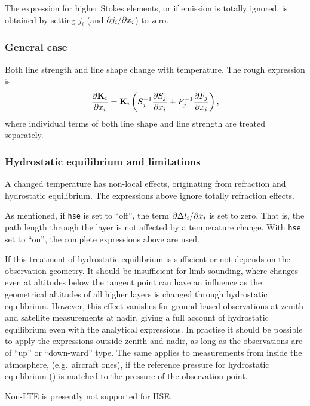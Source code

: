 The expression for higher Stokes elements, or if emission is totally ignored,
is obtained by setting $j_i$ (and $\partial j_i/\partial x_{i}$) to zero.


\subsubsection{General case}
%
Both line strength and line shape change with temperature.
The rough expression is
\begin{equation}
  \frac{\partial \mathbf{K}_i}{\partial x_i} = \mathbf{K}_i
  \left(
  S_j^{-1}\frac{\partial S_j}{\partial x_i}+
  F_j^{-1}\frac{\partial F_j}{\partial x_i}
  \right),
\end{equation}
where individual terms of both line shape and line strength are
treated separately.

\subsubsection{Hydrostatic equilibrium and limitations}
%
A changed temperature has non-local effects, originating from refraction and
hydrostatic equilibrium. The expressions above ignore totally refraction
effects. 

As  mentioned,  if \verb|hse|  is  set  to  ``off'',  the term  $\partial  \Delta
l_{i}/\partial x_{i}$  is set  to  zero. That  is,  the path  length
through the layer is not affected  by a temperature change. With \verb|hse| set
to ``on'', the complete expressions above are used.

If this treatment of hydrostatic equilibrium is sufficient or not depends on
the observation geometry. It should be insufficient for limb sounding,
where changes even at altitudes below the tangent point can have an influence
as the geometrical altitudes of all higher layers is changed through
hydrostatic equilibrium.  However, this effect vanishes for
ground-based observations at zenith and satellite measurements at nadir, giving
a full account of hydrostatic equilibrium even with the analytical expressions.
In practise it should be possible to apply the expressions outside zenith and
nadir, as long as the observations are of ``up'' or ``down-ward'' type. The
same applies to measurements from inside the atmosphere, (e.g.\ aircraft ones),
if the reference pressure for hydrostatic equilibrium () is
matched to the pressure of the observation point.

Non-LTE is presently not supported for HSE.

